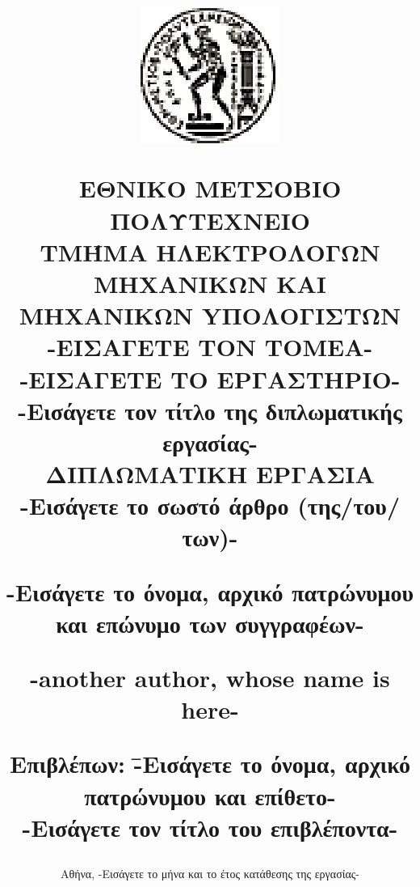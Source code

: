\documentclass[12pt, twoside, a4paper]{report}
\begin{document}
\title{
\vspace{-6ex}
\begin{center}
\includegraphics[scale=1]{pyrforos.eps}
\end{center}
\Large{Ε}\large{ΘΝΙΚO}
\Large{Μ}\large{ΕΤΣOΒΙΟ}
\Large{Π}\large{ΟΛΥΤΕΧΝΕIΟ} \\
\normalsize{Τ}\small{ΜΉΜΑ}
\normalsize{H}\small{ΛΕΚΤΡΟΛΟΓΩΝ}
\normalsize{M}\small{ΗΧΑΝΙΚΩΝ}
\normalsize{K}\small{AI}
\normalsize{M}\small{ΗΧΑΝΙΚΩΝ}
\normalsize{Y}\small{ΠΟΛΟΓΙΣΤΩΝ} \\
\vspace{2ex}
-ΕΙΣΑΓΕΤΕ ΤΟΝ ΤΟΜΕΑ- \\
-ΕΙΣΑΓΕΤΕ ΤΟ ΕΡΓΑΣΤΗΡΙΟ- \\
\vspace{8ex}
\large \textbf{-Εισάγετε τον τίτλο της διπλωματικής εργασίας-} \\
\vspace{10ex}
\large
ΔΙΠΛΩΜΑΤΙΚΗ ΕΡΓΑΣΙΑ\\
\vspace{2ex}
\normalsize
-Εισάγετε το σωστό άρθρο (της/του/των)- \\
\vspace{2ex}
\parbox[c]{0.4\textwidth} { \center\textbf{
-Εισάγετε το όνομα, αρχικό πατρώνυμου και επώνυμο των συγγραφέων- }}
\parbox[c]{0.4\textwidth} { \center\textbf{
	-another author, whose name is here- }}
\vspace{10ex}
\flushleft
\begin{tabbing}
	\textbf{Επιβλέπων}: \= -Εισάγετε το όνομα, αρχικό πατρώνυμου
				και επίθετο- \\
			    \> -Εισάγετε τον τίτλο του επιβλέποντα-
\end{tabbing}
}
\date{
\normalsize
Αθήνα, -Εισάγετε το μήνα και το έτος κατάθεσης της εργασίας-}
\end{document}
